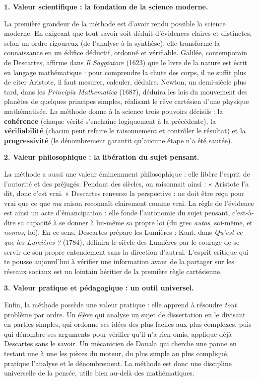 \documentclass[11pt]{article}
\newcommand{\cle}[1]{{\popxbold\color{popdark}#1}}
\newcounter{popsec}
\newcounter{popsub}
\newcommand{\courssub}[1]{%
  \stepcounter{popsub}%
  \par\vspace{9pt}\noindent{\popxbold\fontsize{11.5}{13}\selectfont\color{popink}{\color{poporange}\thepopsec.\thepopsub}\hspace{6pt}#1}\par\nopagebreak\vspace{4pt}
}
\begin{document}
\courssub{La valeur de la méthode cartésienne}

\textbf{1. Valeur scientifique : la fondation de la science moderne.}\par
La première grandeur de la méthode est d'avoir rendu possible la science moderne. En exigeant que tout savoir soit déduit d'évidences claires et distinctes, selon un ordre rigoureux (de l'analyse à la synthèse), elle transforme la connaissance en un édifice \cle{déductif}, ordonné et vérifiable. Galilée, contemporain de Descartes, affirme dans \emph{Il Saggiatore} (1623) que le livre de la nature est écrit en langage mathématique : pour comprendre la chute des corps, il ne suffit plus de citer Aristote, il faut mesurer, calculer, déduire. Newton, un demi-siècle plus tard, dans les \emph{Principia Mathematica} (1687), déduira les lois du mouvement des planètes de quelques principes simples, réalisant le rêve cartésien d'une physique mathématisée. La méthode donne à la science trois pouvoirs décisifs : la \textbf{cohérence} (chaque vérité s'enchaîne logiquement à la précédente), la \textbf{vérifiabilité} (chacun peut refaire le raisonnement et contrôler le résultat) et la \textbf{progressivité} (le dénombrement garantit qu'aucune étape n'a été sautée).

\textbf{2. Valeur philosophique : la libération du sujet pensant.}\par
La méthode a aussi une valeur éminemment philosophique : elle libère l'esprit de l'autorité et des préjugés. Pendant des siècles, on raisonnait ainsi : « Aristote l'a dit, donc c'est vrai. » Descartes renverse la perspective : ne doit être reçu pour vrai que ce que \emph{ma} raison reconnaît clairement comme vrai. La règle de l'évidence est ainsi un acte d'émancipation : elle fonde l'\cle{autonomie} du sujet pensant, c'est-à-dire sa capacité à se donner à lui-même sa propre loi (du grec \emph{autos}, soi-même, et \emph{nomos}, loi). En ce sens, Descartes prépare les Lumières : Kant, dans \emph{Qu'est-ce que les Lumières ?} (1784), définira le siècle des Lumières par le courage de se servir de son propre entendement sans la direction d'autrui. L'esprit critique qui te pousse aujourd'hui à vérifier une information avant de la partager sur les réseaux sociaux est un lointain héritier de la première règle cartésienne.

\textbf{3. Valeur pratique et pédagogique : un outil universel.}\par
Enfin, la méthode possède une valeur pratique : elle apprend à résoudre \emph{tout} problème par ordre. Un élève qui analyse un sujet de dissertation en le divisant en parties simples, qui ordonne ses idées des plus faciles aux plus complexes, puis qui dénombre ses arguments pour vérifier qu'il n'a rien omis, applique déjà Descartes sans le savoir. Un mécanicien de Douala qui cherche une panne en testant une à une les pièces du moteur, du plus simple au plus compliqué, pratique l'analyse et le dénombrement. La méthode est donc une discipline universelle de la pensée, utile bien au-delà des mathématiques.
\end{document}
